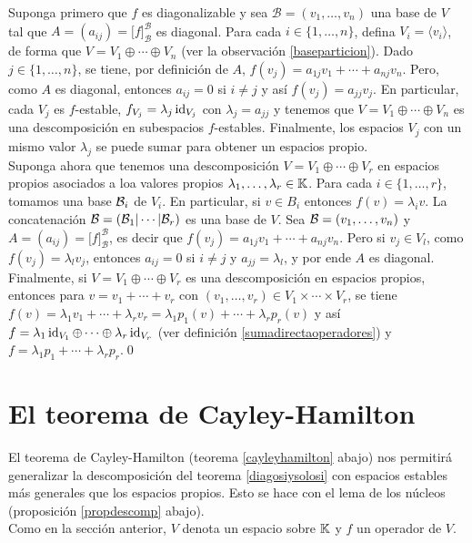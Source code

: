 \dem Suponga primero que $f$ es diagonalizable y sea $\mathcal{B}=(v_1,\ldots,v_n)$ una base de $V$ tal que $A=(a_{ij})=\Big[f\Big]^{\mathcal{B}}_{\mathcal{B}}$ es diagonal. Para cada $i\in\{1,\ldots,n\}$, defina $V_i=\langle v_i\rangle$, de forma que $V=V_1\oplus\cdots\oplus V_n$ (ver la observación \ref{baseparticion}). Dado $j\in\{1,\ldots,n\}$, se tiene, por definición de $A$, $f(v_j)=a_{1j}v_1+\cdots+a_{nj}v_n$. Pero, como $A$ es diagonal, entonces $a_{ij}=0$ si $i\ne j$ y así $f(v_j)=a_{jj}v_j$. En particular, cada $V_j$ es $f$-estable, $f_{V_j}=\lambda_j\operatorname{id}_{V_j}$ con $\lambda_j=a_{jj}$ y tenemos que $V=V_1\oplus\cdots\oplus V_n$ es una descomposición en subespacios $f$-estables. Finalmente, los espacios $V_j$ con un mismo valor $\lambda_j$ se puede sumar para obtener un espacios propio.\\
Suponga ahora que tenemos una descomposición $V=V_1\oplus\cdots\oplus V_r$ en espacios propios asociados a loa valores propios $\lambda_1,\ldots,\lambda_r\in\mathbb{K}$. Para cada $i\in\{1,\ldots,r\}$, tomamos una base $\mathcal{B}_i$ de $V_i$. En particular, si $v\in B_i$ entonces $f(v)=\lambda_iv$. La concatenación $\mathcal{B}=\left(\mathcal{B}_1|\cdots|\mathcal{B}_r\right)$ es una base de $V$. Sea $\mathcal{B}=(v_1,\ldots,v_n)$ y $A=(a_{ij})=\Big[f\Big]^{\mathcal{B}}_{\mathcal{B}}$, es decir que $f(v_j)=a_{1j}v_1+\cdots+a_{nj}v_n$. Pero si $v_j\in V_l$, como $f(v_j)=\lambda_lv_j$, entonces $a_{ij}=0$ si $i\ne j$ y $a_{jj}=\lambda_l$, y por ende $A$ es diagonal.\\
Finalmente, si $V=V_1\oplus\cdots\oplus V_r$ es una descomposición en espacios propios, entonces para $v=v_1+\cdots+v_r$ con $(v_1,\ldots,v_r)\in V_1\times\cdots\times V_r$, se tiene $f(v)=\lambda_1v_1+\cdots+\lambda_rv_r = \lambda_1p_1(v)+\cdots+\lambda_rp_r(v)$ y así $f=\lambda_1\operatorname{id}_{V_1}\oplus\cdots\oplus\lambda_r\operatorname{id}_{V_r}$ (ver definición \ref{sumadirectaoperadores}) y $f=\lambda_1p_1+\cdots+\lambda_rp_r$.\qed

\section{El teorema de Cayley-Hamilton}

El teorema de Cayley-Hamilton (teorema \ref{cayleyhamilton} abajo) nos permitirá generalizar la descomposición del teorema \ref{diagosiysolosi} con espacios estables más generales que los espacios propios. Esto se hace con el lema de los núcleos (proposición \ref{propdescomp} abajo).\\
Como en la sección anterior, $V$ denota un espacio sobre $\mathbb{K}$ y $f$ un operador de $V$.

